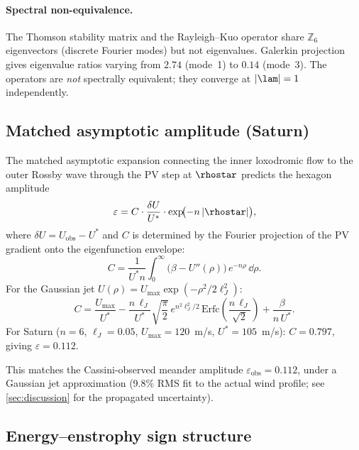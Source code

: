 \paragraph{Spectral non-equivalence.}
The Thomson stability matrix and the Rayleigh--Kuo operator share
$\mathbb{Z}_6$ eigenvectors (discrete Fourier modes) but not eigenvalues.
Galerkin projection gives eigenvalue ratios varying from $2.74$ (mode~1)
to $0.14$ (mode~3).  The operators are \emph{not} spectrally equivalent;
they converge at $|\lam| = 1$ independently.

\subsection{Matched asymptotic amplitude (Saturn)}

\begin{theorem}\label{thm:matching}
The matched asymptotic expansion connecting the inner loxodromic flow
to the outer Rossby wave through the PV step at $\rhostar$ predicts the
hexagon amplitude
\begin{equation}\label{eq:amplitude}
  \varepsilon = C \cdot \frac{\delta U}{U^*} \cdot
  \exp\!\bigl(-n\,|\rhostar|\bigr),
\end{equation}
where $\delta U = U_{\mathrm{obs}} - U^*$ and $C$ is determined by the
Fourier projection of the PV gradient onto the eigenfunction envelope:
\begin{equation}\label{eq:overlap-integral}
  C = \frac{1}{U^* n}\int_0^\infty
  \bigl(\beta - U''(\rho)\bigr)\,e^{-n\rho}\,\dd\rho.
\end{equation}
For the Gaussian jet $U(\rho) = U_{\max}\exp(-\rho^2/2\ell_J^2)$:
\begin{equation}\label{eq:matching-constant}
  C = \frac{U_{\max}}{U^*} - \frac{n\,\ell_J}{U^*}
      \sqrt{\frac{\pi}{2}}\,e^{n^2\ell_J^2/2}\,
      \mathrm{Erfc}\!\left(\frac{n\,\ell_J}{\sqrt{2}}\right)
      + \frac{\beta}{n\,U^*}.
\end{equation}
For Saturn ($n = 6$, $\ell_J = 0.05$, $U_{\max} = 120$~m/s,
$U^* = 105$~m/s): $C = 0.797$, giving $\varepsilon = 0.112$.
\end{theorem}

This matches the Cassini-observed meander amplitude
$\varepsilon_{\mathrm{obs}} = 0.112$, under a Gaussian jet approximation
(9.8\% RMS fit to the actual wind profile; see \cref{sec:discussion} for
the propagated uncertainty).

\subsection{Energy--enstrophy sign structure}
\label{sec:enstrophy}

